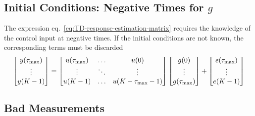 \subsection{Initial Conditions: Negative Times for $g$}

The expression eq.~\eqref{eq:TD-response-estimation-matrix} requires the knowledge of the control input at negative times. If the initial conditions are not known, the corresponding terms must be discarded
\begin{equation*}
  \begin{bmatrix}
    y(\tau_\text{max}) \\ \vdots \\ y(K-1)
  \end{bmatrix} =
  \begin{bmatrix}
    u(\tau_\text{max}) & \ldots & u(0) \\
    \vdots & \ddots & \vdots \\
    u(K-1) & \ldots & u(K-\tau_\text{max}-1)
  \end{bmatrix}
  \begin{bmatrix}
    g(0) \\ \vdots \\ g(\tau_\text{max})
  \end{bmatrix} +
  \begin{bmatrix}
    e(\tau_\text{max}) \\ \vdots \\ e(K-1)
  \end{bmatrix}
\end{equation*}

\subsection{Bad Measurements}

